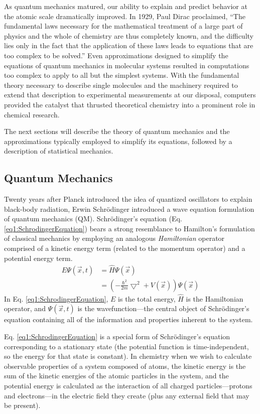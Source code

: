 As quantum mechanics matured, our ability to explain and predict behavior at the
atomic scale dramatically improved. In 1929, Paul Dirac proclaimed, ``The
fundamental laws necessary for the mathematical treatment of a large part of
physics and the whole of chemistry are thus completely known, and the difficulty
lies only in the fact that the application of these laws leads to equations that
are too complex to be solved.'' Even approximations designed to simplify the
equations of quantum mechanics in molecular systems resulted in computations too
complex to apply to all but the simplest systems. With the fundamental theory
necessary to describe single molecules and the machinery required to extend
that description to experimental measurements at our disposal, computers
provided the catalyst that thrusted theoretical chemistry into a prominent role
in chemical research.

The next sections will describe the theory of quantum mechanics and the
approximations typically employed to simplify its equations, followed by
a description of statistical mechanics.

\subsection{Quantum Mechanics}

Twenty years after Planck introduced the idea of quantized oscillators to
explain black-body radiation, Erwin Schr\"odinger introduced a wave equation
formulation of quantum mechanics (QM). \cite{Schrodinger1926} Schr\"odinger's
equation (Eq. \ref{eq1:SchrodingerEquation}) bears a strong resemblance to
Hamilton's formulation of classical mechanics by employing an analogous
\textit{Hamiltonian} operator comprised of a kinetic energy term (related to the
momentum operator) and a potential energy term.
\begin{align}
   E \Psi(\vec{x}, t) & = \hat{H} \Psi(\vec{x}) \nonumber \\
   & = \left ( -\frac {\hbar ^ 2} {2 m} \bigtriangledown ^ 2 + V(\vec{x})
   \right) \Psi(\vec{x})
   \label{eq1:SchrodingerEquation}
\end{align}
In Eq. \ref{eq1:SchrodingerEquation}, $E$ is the total energy, $\hat{H}$ is the
Hamiltonian operator, and $\Psi(\vec{x}, t)$ is the wavefunction---the central
object of Schr\"odinger's equation containing all of the information and
properties inherent to the system.

Eq. \ref{eq1:SchrodingerEquation} is a special form of Schr\"odinger's
equation corresponding to a stationary state (\ie the potential function is
time-independent, so the energy for that state is constant). In chemistry when
we wish to calculate observable properties of a system composed of atoms, the
kinetic energy is the sum of the kinetic energies of the atomic particles in the
system, and the potential energy is calculated as the interaction of all charged
particles---protons and electrons---in the electric field they create (plus any
external field that may be present).

